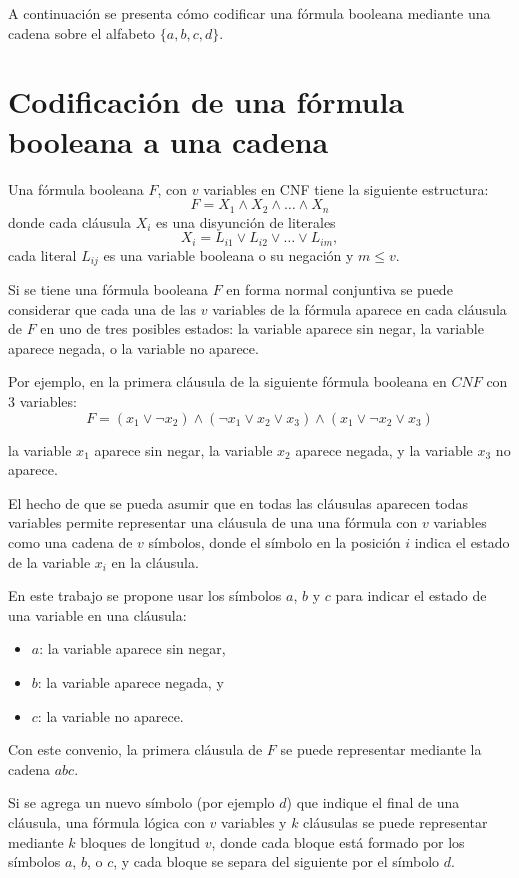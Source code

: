 \documentclass[12pt]{article}
\begin{document}
A continuación se presenta cómo codificar una fórmula booleana mediante una cadena sobre el alfabeto $\{a,b,c,d\}$.

\section{Codificación de una fórmula booleana a una cadena}
\label{sec:codsat}

Una fórmula booleana $F$, con $v$ variables en CNF tiene la siguiente estructura:
$$F=X_1 \wedge X_2 \wedge \ldots \wedge X_n$$
donde cada cláusula $X_i$ es una disyunción de literales
$$X_i=L_{i1} \vee L_{i2} \vee \ldots \vee L_{im},$$
cada literal $L_{ij}$ es una variable booleana o su negación y $m\leq v$. 

Si se tiene una fórmula booleana $F$ en forma normal conjuntiva se puede considerar que cada una de las 
$v$ variables de la fórmula aparece en cada cláusula de $F$ en uno de tres posibles estados: la variable 
aparece sin negar, la variable aparece negada, o la variable no aparece.

Por ejemplo, en la primera cláusula de la siguiente fórmula booleana en $CNF$ con 3 variables:
$$F=(x_1 \vee \neg x_2) \wedge (\neg x_1 \vee x_2 \vee x_3) \wedge (x_1 \vee \neg x_2 \vee x_3)$$

la variable $x_1$ aparece sin negar, la variable $x_2$ aparece negada, y la variable $x_{3}$ no aparece.

El hecho de que se pueda asumir que en todas las cláusulas aparecen todas variables permite representar una cláusula de una una fórmula con $v$ variables como una cadena de $v$ símbolos, donde el símbolo en la posición $i$ indica el estado de la variable $x_i$ en la cláusula.

En este trabajo se propone usar los símbolos $a$, $b$ y $c$ para indicar el estado de una variable en una cláusula:

\begin{itemize}
    \item $a$: la variable aparece sin negar,
    \item $b$: la variable aparece negada, y
    \item $c$: la variable no aparece.
\end{itemize}

Con este convenio, la primera cláusula de $F$ se puede representar mediante la cadena $abc$.

Si se agrega un nuevo símbolo (por ejemplo $d$) que indique el final de una cláusula, una fórmula lógica con $v$ variables y $k$ cláusulas se puede representar mediante $k$ bloques de longitud $v$, donde cada bloque está formado por los símbolos $a$, $b$, o $c$, y cada bloque se separa del siguiente por el símbolo $d$.
\end{document}
